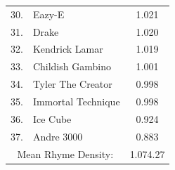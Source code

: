 \begin{table}[p]
\begin{center}
{\begin{tabular}{c|l|c}
        30. & Eazy-E & 1.021 \\
        31. & Drake & 1.020 \\
        32. & Kendrick Lamar & 1.019 \\
        33. & Childish Gambino & 1.001 \\
        34. & Tyler The Creator & 0.998 \\
        35. & Immortal Technique & 0.998 \\
        36. & Ice Cube & 0.924 \\
        37. & Andre 3000 & 0.883 \\\hline
        \multicolumn{2}{c|}{Mean Rhyme Density:} & 1.074.27 \\
        \hline
    \end{tabular}
    }
    \egroup
    \end{center}
\end{table}

